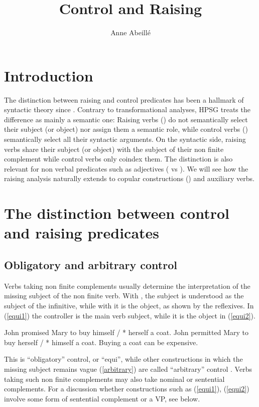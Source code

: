\documentclass[output=paper]{langsci/langscibook}
\author{%
	Anne Abeillé\affiliation{Université de Paris}%
}
\title{Control and Raising}
\begin{document}

\section{Introduction}

The distinction between raising and control predicates has been a hallmark of syntactic theory since \citet{Postal1974}. Contrary to transformational analyses, HPSG treats the difference as mainly a semantic one: Raising verbs () do not semantically select their subject (or object) nor assign them a semantic role, while control verbs () semantically select all their syntactic arguments. On the syntactic side, raising verbs share their subject (or object) with the subject of their non finite complement while control verbs only coindex them. The distinction is also relevant for non verbal predicates such as adjectives ( vs ). We will see how the raising analysis naturally extends to copular constructions () and auxiliary verbs. 



\section{The distinction between control and raising predicates}

\subsection{Obligatory and arbitrary control}

Verbs taking non finite complements usually determine the interpretation of the missing subject of the non finite verb. With , the subject is understood as the subject of the infinitive, while with  it is the object, as shown by the reflexives. In (\ref{equi1}) the controller is the main verb subject, while it is the object in (\ref{equi2}).

	\begin{exe}
	\ex \begin{xlist}
	\ex John promised Mary to buy himself / * herself a coat. \label{equi1}
   \ex 	John permitted Mary to buy herself / * himself a coat.\label{equi2}
 \ex Buying a coat can be expensive.\label{arbitrary}
 \end{xlist}
 \end{exe}

This is ``obligatory'' control, or ``equi'', while other constructions in which the missing subject remains vague (\ref{arbitrary}) are called ``arbitrary'' control \citep{Bresnan1982}.
Verbs taking such non finite complements may also take nominal or sentential complements. For a discussion whether constructions such as (\ref{equi1}), (\ref{equi2}) involve some form of sentential complement or a VP, see below.
\end{document}
